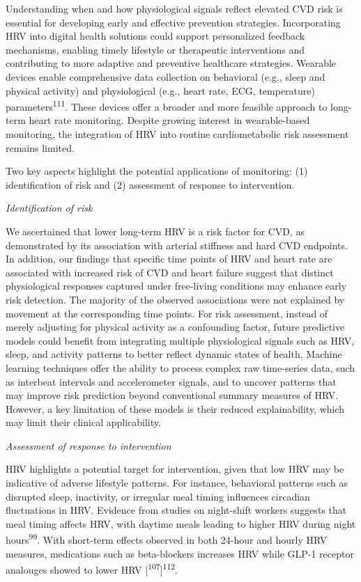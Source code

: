 \documentclass[
  a4paper,
  headsepline=true,
  open=any]{scrbook}
\begin{document}
Understanding when and how physiological signals reflect elevated CVD
risk is essential for developing early and effective prevention
strategies. Incorporating HRV into digital health solutions could
support personalized feedback mechanisms, enabling timely lifestyle or
therapeutic interventions and contributing to more adaptive and
preventive healthcare strategies. Wearable devices enable comprehensive
data collection on behavioral (e.g., sleep and physical activity) and
physiological (e.g., heart rate, ECG, temperature)
parameters\textsuperscript{111}. These devices offer a broader and more
feasible approach to long-term heart rate monitoring. Despite growing
interest in wearable-based monitoring, the integration of HRV into
routine cardiometabolic risk assessment remains limited.

Two key aspects highlight the potential applications of monitoring: (1)
identification of risk and (2) assessment of response to intervention.

\emph{Identification of risk}

We ascertained that lower long-term HRV is a risk factor for CVD, as
demonstrated by its association with arterial stiffness and hard CVD
endpoints. In addition, our findings that specific time points of HRV
and heart rate are associated with increased risk of CVD and heart
failure suggest that distinct physiological responses captured under
free-living conditions may enhance early risk detection. The majority of
the observed associations were not explained by movement at the
corresponding time points. For risk assessment, instead of merely
adjusting for physical activity as a confounding factor, future
predictive models could benefit from integrating multiple physiological
signals such as HRV, sleep, and activity patterns to better reflect
dynamic states of health. Machine learning techniques offer the ability
to process complex raw time-series data, such as interbeat intervals and
accelerometer signals, and to uncover patterns that may improve risk
prediction beyond conventional summary measures of HRV. However, a key
limitation of these models is their reduced explainability, which may
limit their clinical applicability.

\emph{Assessment of response to intervention}

HRV highlights a potential target for intervention, given that low HRV
may be indicative of adverse lifestyle patterns. For instance,
behavioral patterns such as disrupted sleep, inactivity, or irregular
meal timing influences circadian fluctuations in HRV. Evidence from
studies on night-shift workers suggests that meal timing affects HRV,
with daytime meals leading to higher HRV during night
hours\textsuperscript{99}. With short-term effects observed in both
24-hour and hourly HRV measures, medications such as beta-blockers
increases HRV while GLP-1 receptor analouges showed to lower HRV
{[}\textsuperscript{107}{]}\textsuperscript{112}.
\end{document}

